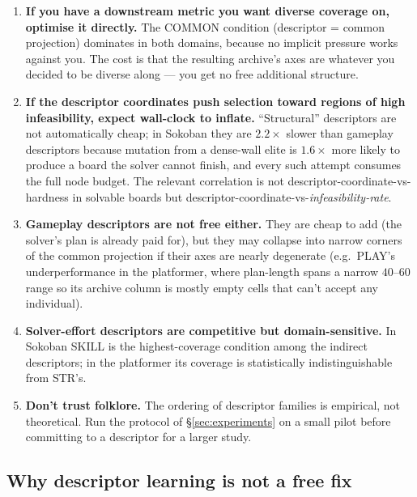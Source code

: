 \documentclass[conference]{IEEEtran}
\begin{document}
\begin{enumerate}
  \item \textbf{If you have a downstream metric you want diverse
        coverage on, optimise it directly.} The \textsf{COMMON}
        condition (descriptor = common projection) dominates in
        both domains, because no implicit pressure works against
        you. The cost is that the resulting archive's axes are
        whatever you decided to be diverse along --- you get no
        free additional structure.

  \item \textbf{If the descriptor coordinates push selection toward
        regions of high infeasibility, expect wall-clock to inflate.}
        ``Structural'' descriptors are not automatically cheap; in
        Sokoban they are $2.2\times$ slower than gameplay
        descriptors because mutation from a dense-wall elite is
        $1.6\times$ more likely to produce a board the solver
        cannot finish, and every such attempt consumes the full
        node budget. The relevant correlation is not
        descriptor-coordinate-vs-hardness in solvable boards but
        descriptor-coordinate-vs-\emph{infeasibility-rate}.

  \item \textbf{Gameplay descriptors are not free either.} They are
        cheap to add (the solver's plan is already paid for), but
        they may collapse into narrow corners of the common
        projection if their axes are nearly degenerate (e.g.\
        \textsf{PLAY}'s underperformance in the platformer, where
        plan-length spans a narrow $40$--$60$ range so its archive
        column is mostly empty cells that can't accept
        any individual).

  \item \textbf{Solver-effort descriptors are competitive but
        domain-sensitive.} In Sokoban \textsf{SKILL} is the
        highest-coverage condition among the indirect descriptors;
        in the platformer its coverage is statistically
        indistinguishable from \textsf{STR}'s.

  \item \textbf{Don't trust folklore.} The ordering of descriptor
        families is empirical, not theoretical. Run the protocol
        of \S\ref{sec:experiments} on a small pilot before
        committing to a descriptor for a larger study.
\end{enumerate}

\subsection{Why descriptor learning is not a free fix}
\end{document}
